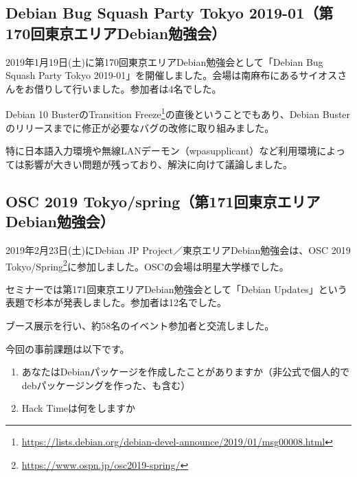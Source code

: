 \documentclass[mingoth,a4paper]{jsarticle}
\begin{document}

\subsection{Debian Bug Squash Party Tokyo 2019-01（第170回東京エリアDebian勉強会）}

2019年1月19日(土)に第170回東京エリアDebian勉強会として「Debian Bug Squash Party Tokyo 2019-01」を開催しました。会場は南麻布にあるサイオスさんをお借りして行いました。参加者は4名でした。

Debian 10 BusterのTransition Freeze\footnote{\url{https://lists.debian.org/debian-devel-announce/2019/01/msg00008.html}}の直後ということでもあり、Debian Busterのリリースまでに修正が必要なバグの改修に取り組みました。

特に日本語入力環境や無線LANデーモン（wpasupplicant）など利用環境によっては影響が大きい問題が残っており、解決に向けて議論しました。

\subsection{OSC 2019 Tokyo/spring（第171回東京エリアDebian勉強会）}

2019年2月23日(土)にDebian JP Project／東京エリアDebian勉強会は、OSC 2019 Tokyo/Spring\footnote{\url{https://www.ospn.jp/osc2019-spring/}}に参加しました。OSCの会場は明星大学様でした。

セミナーでは第171回東京エリアDebian勉強会として「Debian Updates」という表題で杉本が発表しました。参加者は12名でした。

ブース展示を行い、約58名のイベント参加者と交流しました。



今回の事前課題は以下です。

\begin{enumerate}
\item あなたはDebianパッケージを作成したことがありますか（非公式で個人的でdebパッケージングを作った、も含む）
\item Hack Timeは何をしますか
\end{enumerate}


\begin{multicols}{2}
{\small

}
\end{multicols}
\end{document}
